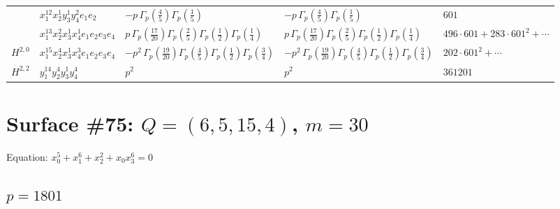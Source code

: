 \documentclass[11pt]{article}
\begin{document}
\begin{table}[ht]
{\begin{tabular}{@{}lllll@{}}
 & $x_{1}^{12} x_{2}^{1} y_{3}^{1} y_{4}^{2} e_{1} e_{2}$ & $- p \, \Gamma_p \left( \frac{4}{5} \right) \Gamma_p \left( \frac{1}{5} \right)$ & $- p \, \Gamma_p \left( \frac{4}{5} \right) \Gamma_p \left( \frac{1}{5} \right)$ & $601$ \\
 & $x_{1}^{13} x_{2}^{2} x_{3}^{1} x_{4}^{1}  e_{1} e_{2} e_{3} e_{4}$ & $p \, \Gamma_p \left( \frac{17}{20} \right) \Gamma_p \left( \frac{2}{5} \right) \Gamma_p \left( \frac{1}{2} \right) \Gamma_p \left( \frac{1}{4} \right)$ & $p \, \Gamma_p \left( \frac{17}{20} \right) \Gamma_p \left( \frac{2}{5} \right) \Gamma_p \left( \frac{1}{2} \right) \Gamma_p \left( \frac{1}{4} \right)$ & $496{\cdot}601{+}283{\cdot}601^{2}{+}\cdots$ \\
\midrule
$H^{2,0}$ & $x_{1}^{15} x_{2}^{4} x_{3}^{1} x_{4}^{3}  e_{1} e_{2} e_{3} e_{4}$ & $- p^{2} \, \Gamma_p \left( \frac{19}{20} \right) \Gamma_p \left( \frac{4}{5} \right) \Gamma_p \left( \frac{1}{2} \right) \Gamma_p \left( \frac{3}{4} \right)$ & $- p^{2} \, \Gamma_p \left( \frac{19}{20} \right) \Gamma_p \left( \frac{4}{5} \right) \Gamma_p \left( \frac{1}{2} \right) \Gamma_p \left( \frac{3}{4} \right)$ & $202{\cdot}601^{2}{+}\cdots$ \\
\midrule
$H^{2,2}$ & $y_{1}^{14} y_{2}^{4} y_{3}^{1} y_{4}^{4}$ & $p^{2} \,$ & $p^{2} \,$ & $361201$ \\
\bottomrule
\end{tabular}
}
\renewcommand{\arraystretch}{1.0}
\end{table}

\newpage

\section*{Surface \#75: $Q=(6, 5, 15, 4)$, $m=30$}

Equation: $x_0^{5} + x_1^{6} + x_2^{2} + x_0 x_3^{6} = 0$

\subsection*{$p = 1801$}
\end{document}
